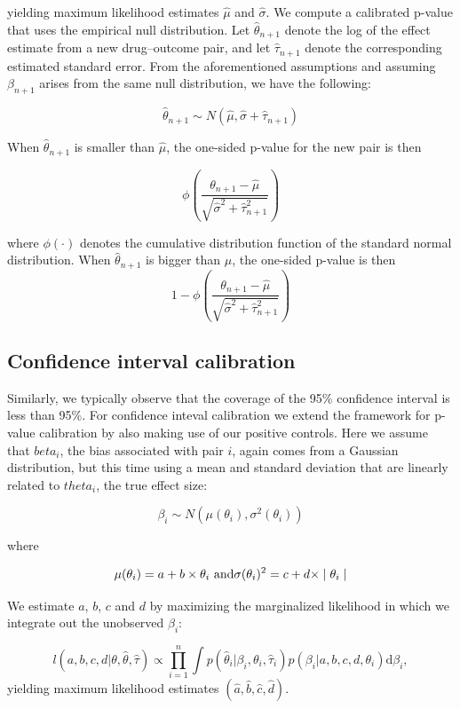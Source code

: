 \documentclass[]{book}
\begin{document}
yielding maximum likelihood estimates \(\hat{\mu}\) and
\(\hat{\sigma}\). We compute a calibrated p-value that uses the
empirical null distribution. Let \(\hat{\theta}_{n+1}\) denote the log
of the effect estimate from a new drug--outcome pair, and let
\(\hat{\tau}_{n+1}\) denote the corresponding estimated standard error.
From the aforementioned assumptions and assuming \(\beta_{n+1}\) arises
from the same null distribution, we have the following:

\[\hat{\theta}_{n+1} \sim N(\hat{\mu}, \hat{\sigma} + \hat{\tau}_{n+1})\]

When \(\hat{\theta}_{n+1}\) is smaller than \(\hat{\mu}\), the one-sided
p-value for the new pair is then

\[\phi\left(\frac{\theta_{n+1} - \hat{\mu}}{\sqrt{\hat{\sigma}^2 + \hat{\tau}_{n+1}^2}}\right)\]

where \(\phi(\cdot)\) denotes the cumulative distribution function of
the standard normal distribution. When \(\hat{\theta}_{n+1}\) is bigger
than \(\hat{\mu}\), the one-sided p-value is then
\[1-\phi\left(\frac{\theta_{n+1} - \hat{\mu}}{\sqrt{\hat{\sigma}^2 + \hat{\tau}_{n+1}^2}}\right)\]

\subsection{Confidence interval
calibration}\label{confidence-interval-calibration}

Similarly, we typically observe that the coverage of the 95\% confidence
interval is less than 95\%. For confidence inteval calibration
\citep{schuemie_2018} we extend the framework for p-value calibration by
also making use of our positive controls. Here we assume that
\(beta_i\), the bias associated with pair \(i\), again comes from a
Gaussian distribution, but this time using a mean and standard deviation
that are linearly related to \(theta_i\), the true effect size:

\[\beta_i \sim N(\mu(\theta_i) , \sigma^2(\theta_i))\]

where

\[\mu(\theta_i) = a + b \times \theta_i \text{ and} \\
  \sigma(\theta_i) ^2= c + d \times \mid \theta_i \mid\]

We estimate \(a\), \(b\), \(c\) and \(d\) by maximizing the marginalized
likelihood in which we integrate out the unobserved \(\beta_i\):

\[l(a,b,c,d | \theta, \hat{\theta}, \hat{\tau} ) \propto \prod_{i=1}^{n}\int p(\hat{\theta}_i|\beta_i, \theta_i, \hat{\tau}_i)p(\beta_i|a,b,c,d,\theta_i) \text{d}\beta_i ,\]
yielding maximum likelihood estimates
\((\hat{a}, \hat{b}, \hat{c}, \hat{d})\).
\end{document}
